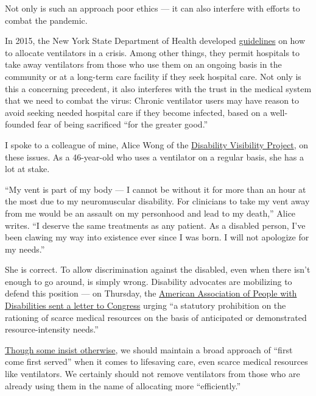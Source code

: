 Not only is such an approach poor ethics --- it can also interfere with
efforts to combat the pandemic.

In 2015, the New York State Department of Health developed
\href{https://www.health.ny.gov/regulations/task_force/reports_publications/docs/ventilator_guidelines.pdf}{guidelines}
on how to allocate ventilators in a crisis. Among other things, they
permit hospitals to take away ventilators from those who use them on an
ongoing basis in the community or at a long-term care facility if they
seek hospital care. Not only is this a concerning precedent, it also
interferes with the trust in the medical system that we need to combat
the virus: Chronic ventilator users may have reason to avoid seeking
needed hospital care if they become infected, based on a well-founded
fear of being sacrificed ``for the greater good.''

I spoke to a colleague of mine, Alice Wong of the
\href{https://disabilityvisibilityproject.com/}{Disability Visibility
Project}, on these issues. As a 46-year-old who uses a ventilator on a
regular basis, she has a lot at stake.

``My vent is part of my body --- I cannot be without it for more than an
hour at the most due to my neuromuscular disability. For clinicians to
take my vent away from me would be an assault on my personhood and lead
to my death,'' Alice writes. ``I deserve the same treatments as any
patient. As a disabled person, I've been clawing my way into existence
ever since I was born. I will not apologize for my needs.''

She is correct. To allow discrimination against the disabled, even when
there isn't enough to go around, is simply wrong. Disability advocates
are mobilizing to defend this position --- on Thursday, the
\href{https://www.aapd.com/wp-content/uploads/2020/03/COVID-19-Response-Package.pdf}{American
Association of People with Disabilities sent a letter to Congress}
urging ``a statutory prohibition on the rationing of scarce medical
resources on the basis of anticipated or demonstrated resource-intensity
needs.''

\href{https://www.nytimes.com/2020/03/12/opinion/coronavirus-hospital-shortage.html}{Though
some insist otherwise}, we should maintain a broad approach of ``first
come first served'' when it comes to lifesaving care, even scarce
medical resources like ventilators. We certainly should not remove
ventilators from those who are already using them in the name of
allocating more ``efficiently.''

